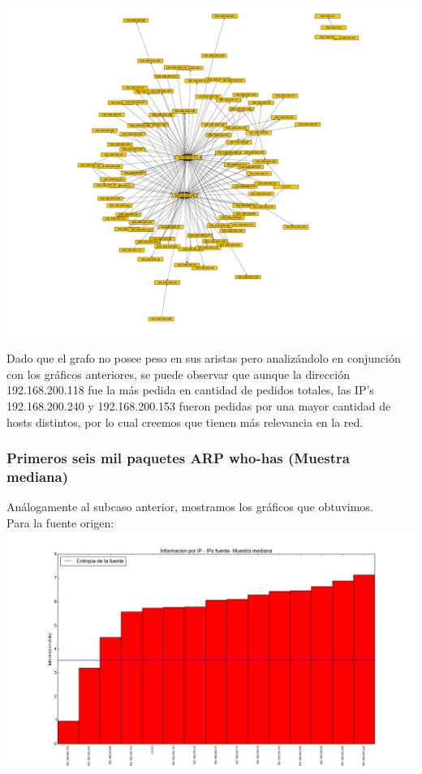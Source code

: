 \includegraphics[scale=0.7,clip=true,trim=140 0 0 0]{graphics/laburochico.pdf}


\indent Dado que el grafo no posee peso en sus aristas pero analizándolo en conjunción con los gráficos anteriores, se puede observar que aunque la dirección 192.168.200.118 fue la más pedida en cantidad de pedidos totales, las IP's 192.168.200.240 y 192.168.200.153 fueron pedidas por una mayor cantidad de hosts distintos, por lo cual creemos que tienen más relevancia en la red.\\


\subsubsection{Primeros seis mil paquetes ARP who-has (Muestra mediana)}

\indent \indent Análogamente al subcaso anterior, mostramos los gráficos que obtuvimos.\\
\indent Para la fuente origen:\\

\includegraphics[scale=0.5,clip=true,trim=100 0 0 0]{graphics/laburo_mediana_src.png}


